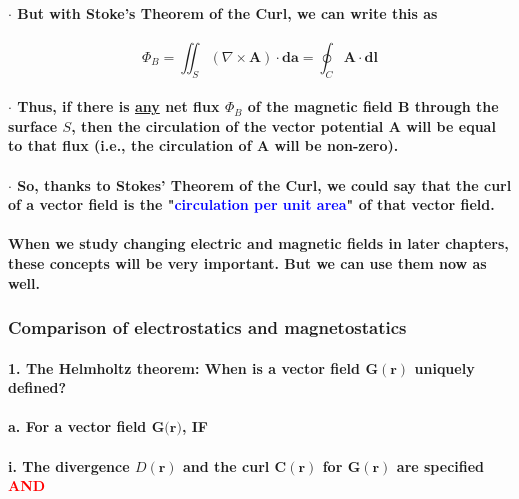 \documentclass{article}
\begin{document}
\paragraph{\indent $\cdot$ But with Stoke's Theorem of the Curl, we can write this as}
\begin{equation*}
    \Phi_B=\iint_S(\nabla\times\boldsymbol{A})\cdot\boldsymbol{da}=\oint_C\boldsymbol{A}\cdot\boldsymbol{dl}
\end{equation*}
\paragraph{\indent $\cdot$ Thus, if there is \underline{any} net flux $\Phi_B$ of the magnetic field $\boldsymbol{B}$ through the surface $S$, then the circulation of the vector potential $\boldsymbol{A}$ will be equal to that flux (i.e., the circulation of $\boldsymbol{A}$ will be non-zero).}
\paragraph{\indent $\cdot$ So, thanks to Stokes' Theorem of the Curl, we could say that the curl of a vector field is the "\textcolor{blue}{circulation per unit area}" of that vector field.}
\paragraph{\indent \indent When we study changing electric and magnetic fields in later chapters, these concepts will be very important. But we can use them now as well.}
\subsubsection{Comparison of electrostatics and magnetostatics}
\paragraph{1. The Helmholtz theorem: When is a vector field $\boldsymbol{G}(\boldsymbol{r})$ uniquely defined?}
\paragraph{\indent a. For a vector field $\boldsymbol{G}(\boldsymbol{r)}$, IF}
\paragraph{\indent\indent i. The divergence $D(\boldsymbol{r})$ and the curl $\boldsymbol{C}(\boldsymbol{r})$ for $\boldsymbol{G}(\boldsymbol{r})$ are specified \textcolor{red}{AND}}
\end{document}
